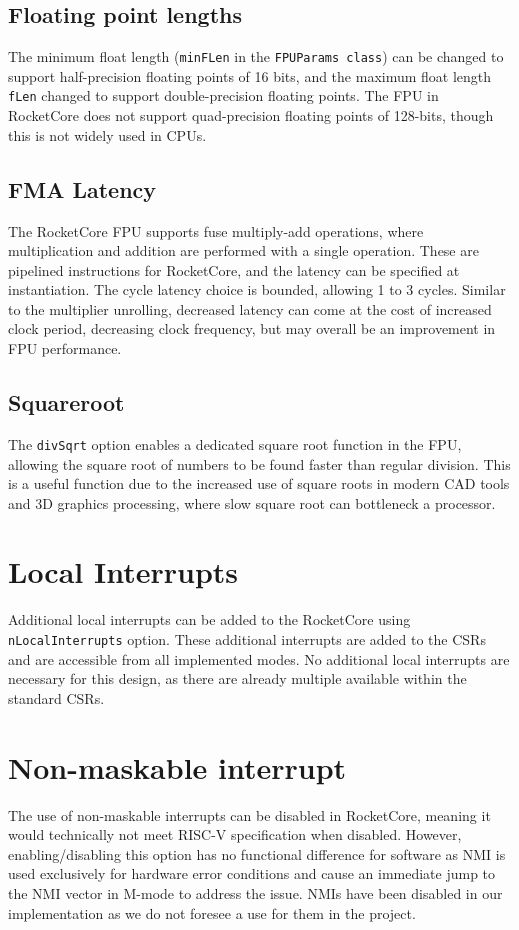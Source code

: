 \subsection{Floating point lengths}
The minimum float length (\texttt{minFLen} in the \texttt{FPUParams class}) can be changed to support half-precision floating points of 16 bits, and the maximum float length \texttt{fLen} changed to support double-precision floating points. The FPU in RocketCore does not support quad-precision floating points of 128-bits, though this is not widely used in CPUs.

\subsection{FMA Latency}
The RocketCore FPU supports fuse multiply-add operations, where multiplication and addition are performed with a single operation. These are pipelined instructions for RocketCore, and the latency can be specified at instantiation. The cycle latency choice is bounded, allowing 1 to 3 cycles. Similar to the multiplier unrolling, decreased latency can come at the cost of increased clock period, decreasing clock frequency, but may overall be an improvement in FPU performance.

\subsection{Squareroot}
The \texttt{divSqrt} option enables a dedicated square root function in the FPU, allowing the square root of numbers to be found faster than regular division. This is a useful function due to the increased use of square roots in modern CAD tools and 3D graphics processing, where slow square root can bottleneck a processor\cite{squareroot-fpu}.

\section{Local Interrupts}
Additional local interrupts can be added to the RocketCore using \texttt{nLocalInterrupts} option. These additional interrupts are added to the CSRs and are accessible from all implemented modes. No additional local interrupts are necessary for this design, as there are already multiple available within the standard CSRs.

\section{Non-maskable interrupt}
The use of non-maskable interrupts can be disabled in RocketCore, meaning it would technically not meet RISC-V specification when disabled. However, enabling/disabling this option has no functional difference for software as NMI is used exclusively for hardware error conditions and cause an immediate jump to the NMI vector in M-mode to address the issue. NMIs have been disabled in our implementation as we do not foresee a use for them in the project.

